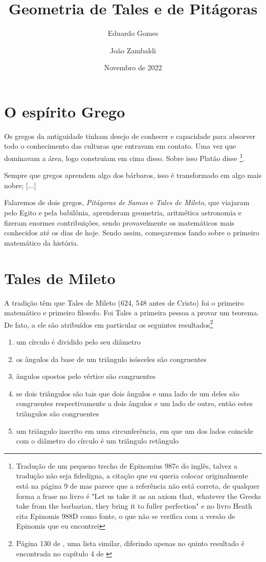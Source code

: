 \documentclass{article}
\title  {Geometria de Tales e de Pitágoras}
\author {Eduardo Gomes \and João Zambaldi}
\date   {Novembro de 2022}
\begin{document}
\maketitle

\section {O espírito Grego} 

Os gregos da antiguidade tinham desejo de conhecer e capacidade
para absorver todo o conhecimento das culturas que entravam em contato.
Uma vez que dominavam a área, logo construíam em cima disso. 
Sobre isso Platão disse \footnote{Tradução de um pequeno trecho de 
Epinomius 987e do inglês, talvez a tradução não seja fidedigna, a 
citação que eu queria colocar originalmente está na página 9 de \cite{Heath} mas 
parece que a referência não está correta, de qualquer forma a frase no
livro é "Let us take it as an axiom that, whatever the Greeks take 
from the barbarian, they bring it to fuller perfection" e no livro 
Heath cita Epinomis 988D como fonte, o que não se verifica com a 
versão de Epinomis que eu encontrei}.

\begin{framed}
	Sempre que gregos aprendem algo dos bárbaros, isso é 
	transformado em algo mais nobre; [...]
\end{framed}

Falaremos de dois gregos, \emph{Pitágoras de Samos} e \emph{Tales de Mileto},
que viajaram pelo Egito e pela babilônia, aprenderam geometria, aritmética
astronomia e fizeram enormes contribuições, sendo provavelmente os matemáticos
mais conhecidos até os dias de hoje. Sendo assim, começaremos fando sobre o primeiro
matemático da história.


\section {Tales de Mileto}

A tradição têm que Tales de Mileto (624, 548 antes de Cristo) foi o primeiro
matemático e primeiro filosofo. Foi Tales a primeira pessoa a provar um teorema.
De fato, a ele são atribuídos em particular os seguintes resultados\footnote{
Página 130 de \cite{Heath}, uma lista similar, diferindo apenas no quinto resultado
é encontrada no capítulo 4 de \cite{Boyer}}
\begin{enumerate}
	\item um círculo é dividido pelo seu diâmetro
	\item os ângulos da base de um triângulo isósceles são congruentes
	\item ângulos opostos pelo vértice são congruentes
	\item se dois triângulos são tais que dois ângulos e uma lado de um deles são
		congruentes respectivamente a dois ângulos e um lado de outro, então
		estes triângulos são congruentes
	\item um triângulo inscrito em uma circunferência, em que um dos lados
		coincide com o diâmetro do círculo é um triângulo retângulo
\end{enumerate}
\end{document}
